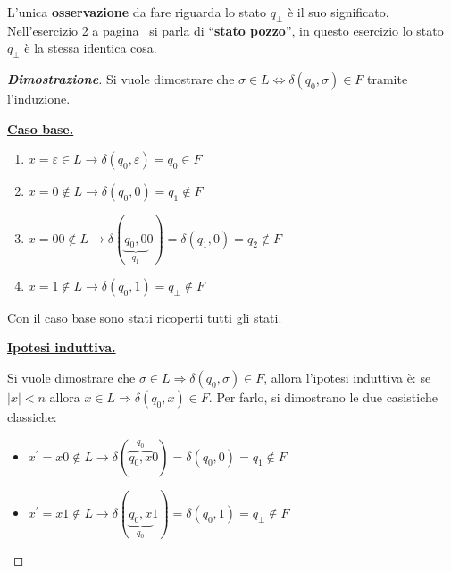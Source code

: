 \documentclass[a4paper]{article}
\newcommand{\dquotes}[1]{``#1''}
\begin{document}
	\noindent
	L'unica \textbf{osservazione} da fare riguarda lo stato $q_{\bot}$ è il suo significato. Nell'esercizio 2 a pagina~\pageref{ASFD-esercizio_2} si parla di \dquotes{\textbf{stato pozzo}}, in questo esercizio lo stato $q_{\bot}$ è la stessa identica cosa.
	
	\newpage
	
	\begin{proof}[\textcolor{Blue3}{\textbf{Dimostrazione}}]
		Si vuole dimostrare che $\sigma \in L \iff \delta\left(q_{0}, \sigma\right) \in F$ tramite l'induzione.\newline
		
		\noindent
		\textbf{\underline{Caso base.}}
		
		\begin{enumerate}
			\item $x = \varepsilon \in L \longrightarrow \delta\left(q_{0}, \varepsilon\right) = q_{0} \in F$
			
			\item $x = 0 \notin L \longrightarrow \delta\left(q_{0}, 0\right) = q_{1} \notin F$
			
			\item $x = 00 \notin L \longrightarrow \delta(\underbrace{q_{0}, 0}_{q_{1}} 0) = \delta\left(q_{1}, 0\right) = q_{2} \notin F$
			
			\item $x = 1 \notin L \longrightarrow \delta\left(q_{0}, 1\right) = q_{\bot} \notin F$
		\end{enumerate}
		
		\noindent
		Con il caso base sono stati ricoperti tutti gli stati.\newline
		
		\noindent
		\textbf{\underline{Ipotesi induttiva.}}\newline
		
		\noindent
		Si vuole dimostrare che $\sigma \in L \Longrightarrow \delta\left(q_{0}, \sigma\right) \in F$, allora l'ipotesi induttiva è: se $|x| < n$ allora $x \in L \Longrightarrow \delta\left(q_{0}, x\right) \in F$. Per farlo, si dimostrano le due casistiche classiche:
		
		\begin{itemize}
			\item $x^{'} = x0 \notin L \longrightarrow \delta(\overbrace{q_{0}, x}^{q_{0}} 0) = \delta\left(q_{0}, 0\right) = q_{1} \notin F$
			
			\item $x^{'} = x1 \notin L \longrightarrow \delta(\underbrace{q_{0}, x}_{q_{0}} 1) = \delta\left(q_{0}, 1\right) = q_{\bot} \notin F$
		\end{itemize}
	\end{proof}
\end{document}

